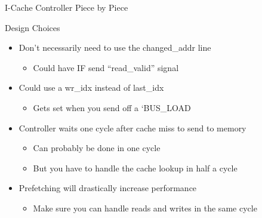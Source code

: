 \documentclass[table,dvipsnames]{beamer}
\begin{document}
\begin{frame}[fragile]{I-Cache Controller Piece by Piece}
	\begin{block}{Design Choices}
	\begin{itemize}
		\item Don't necessarily need to use the changed\_addr line
		\begin{itemize} \item Could have IF send ``read\_valid'' signal \end{itemize}
		\item Could use a wr\_idx instead of last\_idx
		\begin{itemize} \item Gets set when you send off a `BUS\_LOAD \end{itemize}
		\item Controller waits one cycle after cache miss to send to memory
		\begin{itemize} \item Can probably be done in one cycle 
		\item But you have to handle the cache lookup in half a cycle \end{itemize}
		\item Prefetching will drastically increase performance
		\begin{itemize} \item Make sure you can handle reads and writes in the same cycle \end{itemize}
		
	\end{itemize}

	\end{block}	
\end{frame}
\end{document}
